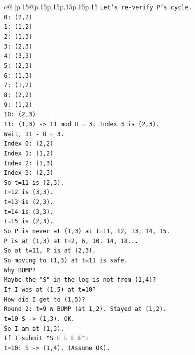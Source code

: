 \documentclass{article}
\begin{document}
{\begin{supertabular}{c@{$\;$}|p{.15\linewidth}@{}p{.15\linewidth}p{.15\linewidth}p{.15\linewidth}p{.15\linewidth}p{.15\linewidth}}
{{{\texttt{Let's re{-}verify P's cycle.} \\
\texttt{0: (2,2)} \\
\texttt{1: (1,2)} \\
\texttt{2: (1,3)} \\
\texttt{3: (2,3)} \\
\texttt{4: (3,3)} \\
\texttt{5: (2,3)} \\
\texttt{6: (1,3)} \\
\texttt{7: (1,2)} \\
\texttt{8: (2,2)} \\
\texttt{9: (1,2)} \\
\texttt{10: (2,3)} \\
\texttt{11: (1,3) {-}> 11 mod 8 = 3. Index 3 is (2,3).} \\
\texttt{Wait, 11 {-} 8 = 3.} \\
\texttt{Index 0: (2,2)} \\
\texttt{Index 1: (1,2)} \\
\texttt{Index 2: (1,3)} \\
\texttt{Index 3: (2,3)} \\
\texttt{So t=11 is (2,3).} \\
\texttt{t=12 is (3,3).} \\
\texttt{t=13 is (2,3).} \\
\texttt{t=14 is (3,3).} \\
\texttt{t=15 is (2,3).} \\
\texttt{So P is never at (1,3) at t=11, 12, 13, 14, 15.} \\
\texttt{P is at (1,3) at t=2, 6, 10, 14, 18...} \\
\texttt{So at t=11, P is at (2,3).} \\
\texttt{So moving to (1,3) at t=11 is safe.} \\
\texttt{Why BUMP?} \\
\texttt{Maybe the "S" in the log is not from (1,4)?} \\
\texttt{If I was at (1,5) at t=10?} \\
\texttt{How did I get to (1,5)?} \\
\texttt{Round 2: t=9 W BUMP (at 1,2). Stayed at (1,2).} \\
\texttt{t=10 S {-}> (1,3). OK.} \\
\texttt{So I am at (1,3).} \\
\texttt{If I submit "S E E E E":} \\
\texttt{t=10: S {-}> (1,4). (Assume OK).} \\
}}}
\end{supertabular}}
\end{document}
